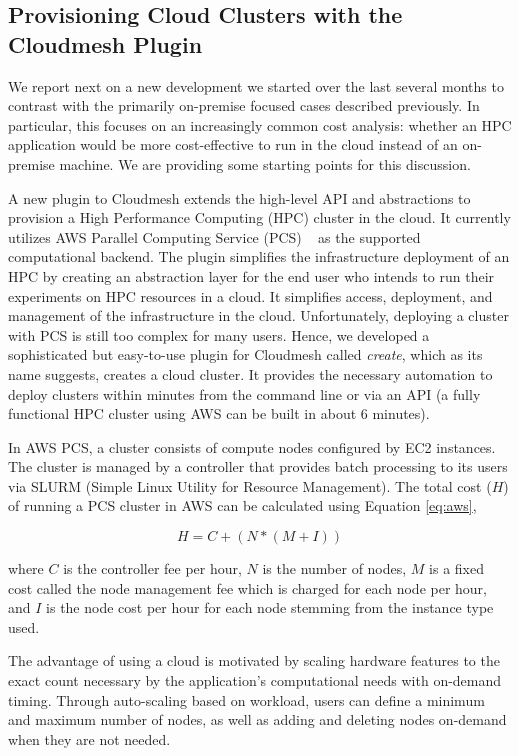 \subsection{Provisioning Cloud Clusters with the Cloudmesh Plugin}
\label{sec:cloudcluster}

We report next on a new development we started over the last several months to contrast with the primarily on-premise focused cases described previously. In particular, this focuses on an increasingly common cost analysis: whether an HPC application would be more cost-effective to run in the cloud instead of an on-premise machine. We are providing some starting points for this discussion.

A new plugin to Cloudmesh extends the high-level API and abstractions to provision a High Performance Computing  (HPC) cluster in the cloud. It currently utilizes AWS Parallel Computing Service (PCS) ~\citep{awspcs:online} as the supported computational backend. The plugin simplifies the infrastructure deployment of an HPC by creating an abstraction layer for the end user who intends to run their experiments on HPC resources in a cloud. It simplifies access, deployment, and management of the infrastructure in the cloud. Unfortunately, deploying a cluster with PCS is still too complex for many users. Hence, we developed a sophisticated but easy-to-use plugin for Cloudmesh called {\em create}, which as its name suggests, creates a cloud cluster. It provides the necessary automation to deploy clusters within minutes from the command line or via an API (a fully functional HPC cluster using AWS can be built in about 6 minutes).  

In AWS PCS, a cluster consists of compute nodes configured by EC2 instances. The cluster is managed by a controller that provides batch processing to its users via SLURM (Simple Linux Utility for Resource Management).  The total cost ($H$) of running a PCS cluster in AWS can be calculated using Equation \ref{eq:aws},

\begin{equation}
 H = C + (N * (M + I)) \label{eq:aws}
\end{equation}

where 
$C$ is the controller fee per hour, 
$N$ is the number of nodes, 
$M$ is a fixed cost called the node management fee which is charged for each node per hour, and
$I$ is the node cost per hour for each node stemming from the instance type used.

The advantage of using a cloud is motivated by scaling hardware features to the exact count necessary by the application's computational needs with on-demand timing. Through auto-scaling based on workload, users can define a minimum and maximum number of nodes, as well as adding and deleting nodes on-demand when they are not needed.


